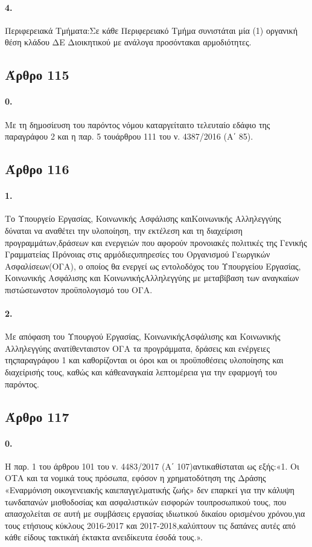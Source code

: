 \documentclass[a4paper,oneside, 10pt]{book}
\begin{document}
\paragraph { 4. } Περιφερειακά Τμήματα:Σε κάθε Περιφερειακό Τμήμα συνιστάται μία (1) οργανική θέση κλάδου ΔΕ Διοικητικού με ανάλογα προσόντακαι αρμοδιότητες.
\subsection*{ Άρθρο 115 }
\paragraph { 0. } Με τη δημοσίευση του παρόντος νόμου καταργείταιτο τελευταίο εδάφιο της παραγράφου 2 και η παρ. 5 τουάρθρου 111 του ν. 4387/2016 (Α΄ 85).
\subsection*{ Άρθρο 116 }
\paragraph { 1. } Το Υπουργείο Εργασίας, Κοινωνικής Ασφάλισης καιΚοινωνικής Αλληλεγγύης δύναται να αναθέτει την υλοποίηση, την εκτέλεση και τη διαχείριση προγραμμάτων,δράσεων και ενεργειών που αφορούν προνοιακές πολιτικές της Γενικής Γραμματείας Πρόνοιας στις αρμόδιεςυπηρεσίες του Οργανισμού Γεωργικών Ασφαλίσεων(ΟΓΑ), ο οποίος θα ενεργεί ως εντολοδόχος του Υπουργείου Εργασίας, Κοινωνικής Ασφάλισης και ΚοινωνικήςΑλληλεγγύης με μεταβίβαση των αναγκαίων πιστώσεωνστον προϋπολογισμό του ΟΓΑ.
\paragraph { 2. } Με απόφαση του Υπουργού Εργασίας, ΚοινωνικήςΑσφάλισης και Κοινωνικής Αλληλεγγύης ανατίθενταιστον ΟΓΑ τα προγράμματα, δράσεις και ενέργειες τηςπαραγράφου 1 και καθορίζονται οι όροι και οι προϋποθέσεις υλοποίησης και διαχείρισής τους, καθώς και κάθεαναγκαία λεπτομέρεια για την εφαρμογή του παρόντος.
\subsection*{ Άρθρο 117 }
\paragraph { 0. } Η παρ. 1 του άρθρου 101 του ν. 4483/2017 (Α΄ 107)αντικαθίσταται ως εξής:«1. Οι ΟΤΑ και τα νομικά τους πρόσωπα, εφόσον η χρηματοδότηση της Δράσης «Εναρμόνιση οικογενειακής καιεπαγγελματικής ζωής» δεν επαρκεί για την κάλυψη τωνδαπανών μισθοδοσίας και ασφαλιστικών εισφορών τουπροσωπικού τους, που απασχολείται σε αυτή με συμβάσεις εργασίας ιδιωτικού δικαίου ορισμένου χρόνου,για τους ετήσιους κύκλους 2016-2017 και 2017-2018,καλύπτουν τις δαπάνες αυτές από κάθε είδους τακτικάή έκτακτα ανειδίκευτα έσοδά τους.».
\end{document}
